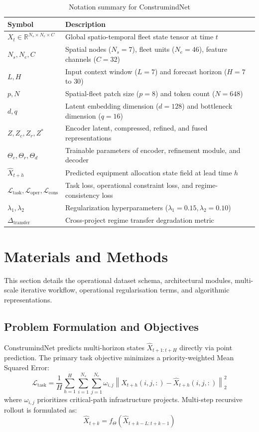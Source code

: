 \documentclass[pdflatex,sn-mathphys,Numbered]{sn-jnl}%
\begin{document}
\begin{table}[h]
\caption{Notation summary for ConstrumindNet}\label{tab2}
\begin{tabular}{@{}ll@{}}
\toprule
Symbol & Description \\
\midrule
$X_t \in \mathbb{R}^{N_s \times N_e \times C}$ & Global spatio-temporal fleet state tensor at time $t$ \\
$N_s, N_e, C$ & Spatial nodes ($N_s=7$), fleet units ($N_e=46$), feature channels ($C=32$) \\
$L, H$ & Input context window ($L=7$) and forecast horizon ($H=7$ to $30$) \\
$p, N$ & Spatial-fleet patch size ($p=8$) and token count ($N=648$) \\
$d, q$ & Latent embedding dimension ($d=128$) and bottleneck dimension ($q=16$) \\
$Z, Z_c, Z_r, Z^*$ & Encoder latent, compressed, refined, and fused representations \\
$\Theta_e, \Theta_r, \Theta_d$ & Trainable parameters of encoder, refinement module, and decoder \\
$\widehat{X}_{t+h}$ & Predicted equipment allocation state field at lead time $h$ \\
$\mathcal{L}_{\text{task}}, \mathcal{L}_{\text{oper}}, \mathcal{L}_{\text{cons}}$ & Task loss, operational constraint loss, and regime-consistency loss \\
$\lambda_1, \lambda_2$ & Regularization hyperparameters ($\lambda_1 = 0.15, \lambda_2 = 0.10$) \\
$\Delta_{\text{transfer}}$ & Cross-project regime transfer degradation metric \\
\bottomrule
\end{tabular}
\end{table}

\section{Materials and Methods}\label{sec4}
This section details the operational dataset schema, architectural modules, multi-scale iterative workflow, operational regularisation terms, and algorithmic representations.

\subsection{Problem Formulation and Objectives}
ConstrumindNet predicts multi-horizon states $\widehat{X}_{t+1:t+H}$ directly via point prediction. The primary task objective minimizes a priority-weighted Mean Squared Error:
\begin{equation}
\mathcal{L}_{\text{task}} = \frac{1}{H} \sum_{h=1}^H \sum_{i=1}^{N_s} \sum_{j=1}^{N_e} \omega_{i, j} \left\| X_{t+h}(i, j, :) - \widehat{X}_{t+h}(i, j, :) \right\|_2^2 \label{eq5}
\end{equation}
where $\omega_{i, j}$ prioritizes critical-path infrastructure projects. Multi-step recursive rollout is formulated as:
\begin{equation}
\widehat{X}_{t+k} = f_\Theta\left(\widehat{X}_{t+k-L:t+k-1}\right) \label{eq6}
\end{equation}
\end{document}
